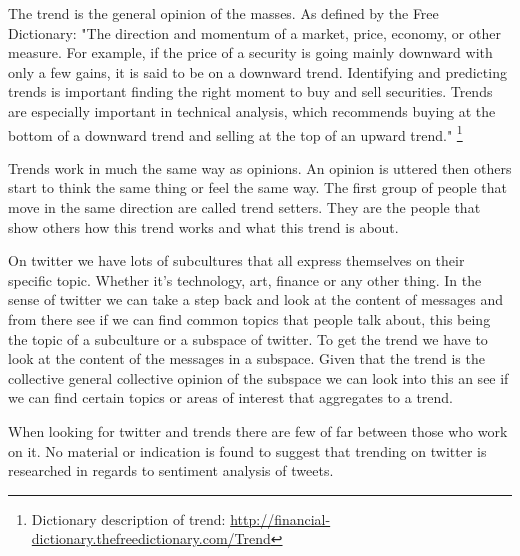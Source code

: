 The trend is the general opinion of the masses. As defined by the Free
Dictionary:  
"The direction and momentum of a market, price, economy, or other measure. For
example, if the price of a security is going mainly downward with only a few
gains, it is said to be on a downward trend. Identifying and
predicting trends is important finding the right moment to buy and sell
securities. Trends are especially important in technical analysis, which
recommends buying at the bottom of a downward trend and selling at the top of an
upward trend."
\footnote{Dictionary description of trend: \url{http://financial-dictionary.thefreedictionary.com/Trend}}

Trends work in much the same way as opinions. An opinion is uttered then others start to think the same thing or
feel the same way. The first group of people that move in the same direction
are called trend setters. They are the people that show others how this trend works and
what this trend is about. 

On twitter we have lots of subcultures that all express themselves on their
specific topic. Whether it's technology, art, finance or any other thing.  
In the sense of twitter we can take a step back and look at the content of
messages and from there see if we can find common topics that people talk
about, this being the topic of a subculture or a subspace of twitter. To get
the trend we have to look at the content of the messages in a subspace. Given
that the trend is the collective general collective opinion of the subspace we
can look into this an see if we can find certain topics or areas of interest
that aggregates to a trend. 

When looking for twitter and trends there are few of far between those who work
on it. No material or indication is found to suggest that trending on twitter
is researched in regards to sentiment analysis of tweets.

